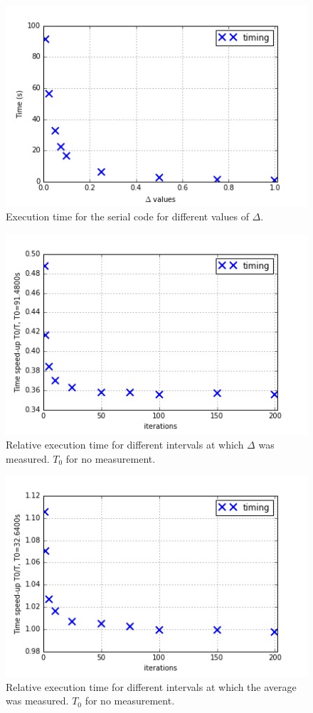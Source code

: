 \documentclass[11pt]{article}
\begin{document}
	
	\begin{figure}[H]	
		\centering
		\includegraphics[scale=0.5]{serialvs3.jpeg}
		\caption{Execution time for the serial code for different values of $\Delta$.}\label{serial3}
	\end{figure}

	\begin{figure}[H]	
		\centering
		\includegraphics[scale=0.5]{serialvs4.jpeg}
		\caption{Relative execution time for different intervals at which $\Delta$ was measured. $T_0$ for no measurement.}\label{serial4}
	\end{figure}
	
	\begin{figure}[H]	
		\centering
		\includegraphics[scale=0.5]{serialvs5.jpeg}
		\caption{Relative execution time for different intervals at which the average was measured. $T_0$ for no measurement.}\label{serial5}
	\end{figure}
\end{document}
